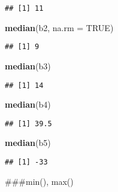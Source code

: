 \documentclass[
]{article}
\newenvironment{Shaded}{\begin{snugshade}}{\end{snugshade}}
\newcommand{\AttributeTok}[1]{\textcolor[rgb]{0.13,0.29,0.53}{#1}}
\newcommand{\ConstantTok}[1]{\textcolor[rgb]{0.56,0.35,0.01}{#1}}
\newcommand{\FunctionTok}[1]{\textcolor[rgb]{0.13,0.29,0.53}{\textbf{#1}}}
\newcommand{\NormalTok}[1]{#1}
\begin{document}
\begin{verbatim}
## [1] 11
\end{verbatim}

\begin{Shaded}
\begin{Highlighting}[]
\FunctionTok{median}\NormalTok{(b2, }\AttributeTok{na.rm =} \ConstantTok{TRUE}\NormalTok{)}
\end{Highlighting}
\end{Shaded}

\begin{verbatim}
## [1] 9
\end{verbatim}

\begin{Shaded}
\begin{Highlighting}[]
\FunctionTok{median}\NormalTok{(b3)}
\end{Highlighting}
\end{Shaded}

\begin{verbatim}
## [1] 14
\end{verbatim}

\begin{Shaded}
\begin{Highlighting}[]
\FunctionTok{median}\NormalTok{(b4)}
\end{Highlighting}
\end{Shaded}

\begin{verbatim}
## [1] 39.5
\end{verbatim}

\begin{Shaded}
\begin{Highlighting}[]
\FunctionTok{median}\NormalTok{(b5)}
\end{Highlighting}
\end{Shaded}

\begin{verbatim}
## [1] -33
\end{verbatim}

\#\#\#min(), max()
\end{document}
